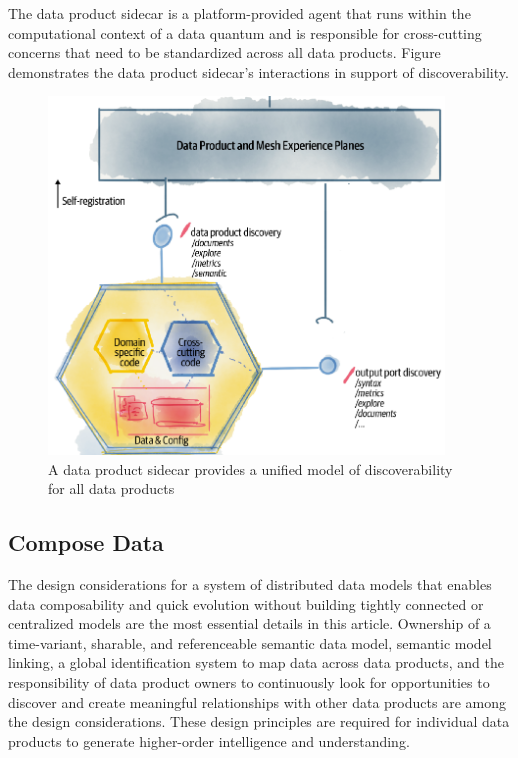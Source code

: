 \documentclass[12pt, a4paper]{book}
\begin{document}
The data product sidecar is a platform-provided agent that runs within the computational context of a data quantum and is responsible for cross-cutting concerns that need to be standardized across all data products. Figure demonstrates the data product sidecar’s interactions in support of discoverability. 

\begin{figure}[ht]
	\begin{framed}
		\centering
		\includegraphics[width=10.5cm]{DiscoverData.png}
		\caption{A data product sidecar provides a unified model of discoverability for all data products}
		\label{DiscoverData}
	\end{framed}
\end{figure}
\vspace{-.3cm}
\subsection{Compose Data}
The design considerations for a system of distributed data models that enables data composability and quick evolution without building tightly connected or centralized models are the most essential details in this article. Ownership of a time-variant, sharable, and referenceable semantic data model, semantic model linking, a global identification system to map data across data products, and the responsibility of data product owners to continuously look for opportunities to discover and create meaningful relationships with other data products are among the design considerations. These design principles are required for individual data products to generate higher-order intelligence and understanding.
\end{document}
